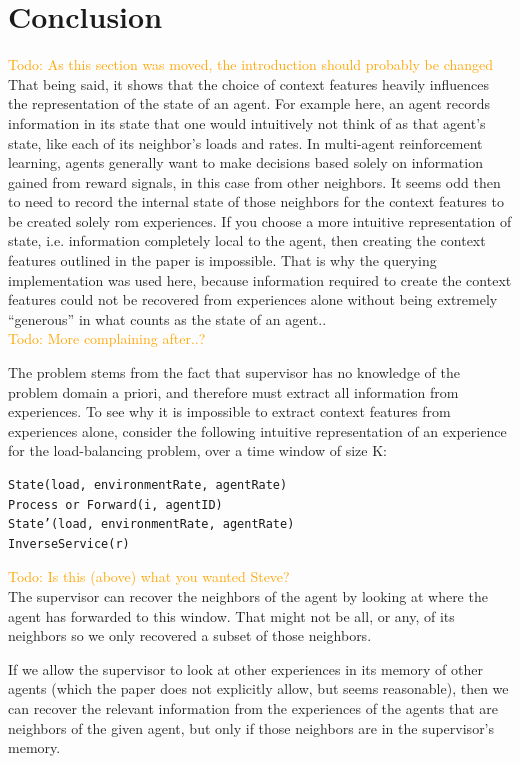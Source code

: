 \documentclass[letterpaper]{article}
\newcommand\todo[1]{\textcolor{orange}{Todo: #1}}
\begin{document}
\section{Conclusion}
\todo{As this section was moved, the introduction should probably be changed}\\
That being said, it shows that the choice of context features heavily influences the representation of the state of an agent.  For example here, an agent records information in its state that one would intuitively not think of as that agent’s state, like each of its neighbor’s loads and rates.  In multi-agent reinforcement learning, agents generally want to make decisions based solely on information gained from reward signals, in this case from other neighbors.  It seems odd then to need to record the internal state of those neighbors for the context features to be created solely rom experiences.  If you choose a more intuitive representation of state, i.e. information completely local to the agent, then creating the context features outlined in the paper is impossible. That is why the querying implementation was used here, because information required to create the context features could not be recovered from experiences alone without being extremely “generous” in what counts as the state of an agent..
\\\todo{More complaining after..?}

The problem stems from the fact that supervisor has no knowledge of the problem domain a priori, and therefore must extract all information from experiences. To see why it is impossible to extract context features from experiences alone, consider the following intuitive representation of an experience for the load-balancing problem, over a time window of size K:
\begin{lstlisting}
State(load, environmentRate, agentRate)
Process or Forward(i, agentID)
State’(load, environmentRate, agentRate)
InverseService(r)
\end{lstlisting}
\todo{Is this (above) what you wanted Steve?}\\
The supervisor can recover the neighbors of the agent by looking at where the agent has forwarded to this window.  That might not be all, or any, of its neighbors so we only recovered a subset of those neighbors.

If we allow the supervisor to look at other experiences in its memory of other agents (which the paper does not explicitly allow, but seems reasonable), then we can recover the relevant information from the experiences of the agents that are neighbors of the given agent, but only if those neighbors are in the supervisor’s memory.
\end{document}
